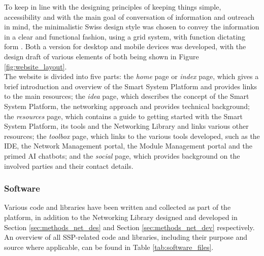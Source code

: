To keep in line with the designing principles of keeping things simple, accessibility and with the main goal of conversation of information and outreach in mind, the minimalistic Swiss design style was chosen to convey the information in a clear and functional fashion, using a grid system, with function dictating form \citep{muller-brockmann_grid_2020, hollis_swiss_2006}. Both a version for desktop and mobile devices was developed, with the design draft of various elements of both being shown in Figure \ref{fig:website_layout}.\\

The website is divided into five parts: the \textit{home} page or \textit{index} page, which gives a brief introduction and overview of the Smart System Platform and provides links to the main resources; the \textit{idea} page, which describes the concept of the Smart System Platform, the networking approach and provides technical background; the \textit{resources} page, which contains a guide to getting started with the Smart System Platform, its tools and the Networking Library and links various other resources; the \textit{toolbox} page, which links to the various tools developed, such as the IDE, the Network Management portal, the Module Management portal and the primed AI chatbots; and the \textit{social} page, which provides background on the involved parties and their contact details. %


\subsubsection{\label{sec:methods_sw}Software}

Various code and libraries have been written and collected as part of the platform, in addition to the Networking Library designed and developed in Section \ref{sec:methods_net_des} and Section \ref{sec:methods_net_dev} respectively. An overview of all SSP-related code and libraries, including their purpose and source where applicable, can be found in Table \ref{tab:software_files}.\\

